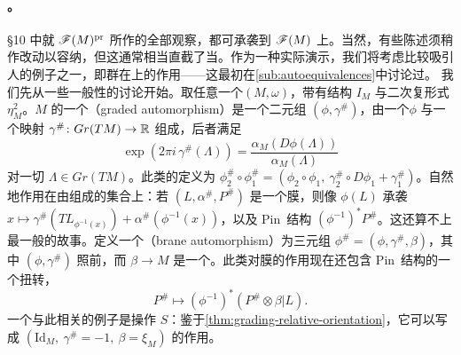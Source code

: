 \paragraph{\trAutomorphism。}\label{sub:automorphisms}
§10 中就 $\mathscr{F}(M)^{\mathrm{pr}}$ 所作的全部观察，都可承袭到 $\mathscr{F}(M)$ 上。当然，有些陈述须稍作改动以容纳\trBraneStructure，但这通常相当直截了当。作为一种实际演示，我们将考虑比较吸引人的例子之一，即\trSymplectic\trAutomorphism{}群在\trFukayaCategory{}上的作用——这最初在\cref{sub:autoequivalences}中讨论过。
我们先从一些一般性的讨论开始。取任意一个\trSymplectic\trManifold{}$(M,\omega)$，带有\trAlmostComplex{}结构 $I_M$ 与二次复\trVolume{}形式 $\eta_M^2$。$M$ 的一个\textbf{\trGraded\trAutomorphism}（graded automorphism）是一个二元组 $(\phi,\gamma^{\#})$，由一个\trSymplectic\trAutomorphism{}$\phi$ 与一个映射 $\gamma^{\#}\colon Gr(TM)\to\mathbb{R}$ 组成，后者满足
\begin{equation*}
\exp(2\pi i\,\gamma^{\#}(\Lambda))=\frac{\alpha_M(D\phi(\Lambda))}{\alpha_M(\Lambda)}
\end{equation*}
对一切 $\Lambda\in Gr(TM)$。此类\trAutomorphism{}的\trComposition{}定义为 $\phi_2^{\#}\circ\phi_1^{\#}=(\phi_2\circ\phi_1,\ \gamma_2^{\#}\circ D\phi_1+\gamma_1^{\#})$。\trGraded\trAutomorphism{}自然地作用在由\trLagrange\trBrane{}组成的集合上：若 $(L,\alpha^{\#},P^{\#})$ 是一个膜，则像 $\phi(L)$ 承袭\trGrading{}$x\mapsto\gamma^{\#}(TL_{\phi^{-1}(x)})+\alpha^{\#}(\phi^{-1}(x))$，以及\trPushforward{} Pin~结构 $(\phi^{-1})^*P^{\#}$。这还算不上最一般的故事。定义一个\textbf{\trBrane\trAutomorphism}（brane automorphism）为三元组 $\phi^{\#}=(\phi,\gamma^{\#},\beta)$，其中 $(\phi,\gamma^{\#})$ 照前，而 $\beta\to M$ 是一个\trRealLineBundle。此类\trAutomorphism{}对膜的作用现在还包含 Pin~结构的一个扭转，
\begin{equation}\label{eq:brane-automorphism-pin-twist}
P^{\#}\mapsto(\phi^{-1})^*(P^{\#}\otimes\beta|L).
\end{equation}
一个与此相关的例子是\trSuspension{}操作 $S$：鉴于\cref{thm:grading-relative-orientation}，它可以写成 $(\mathrm{Id}_M,\ \gamma^{\#}=-1,\ \beta=\xi_M)$ 的作用。
